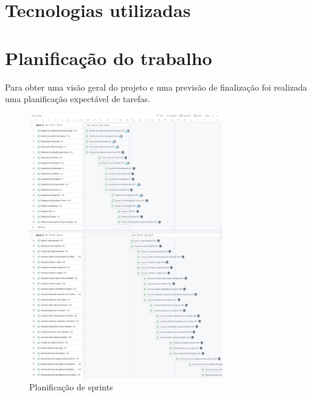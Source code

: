 \newpage

\section{Tecnologias utilizadas}




\newpage



\newpage



\newpage

\section{Planificação do trabalho}\label{sec:planificacao trabalho}

Para obter uma visão geral do projeto e uma previsão de finalização foi realizada uma planificação expectável de tarefas.

\begin{figure}[htb]
    \centering
    
    \includegraphics[width=0.75\textwidth]{images/etapa1_sprint_planning.png}
    \caption{Planificação de sprints}
    \label{fig:1}
\end{figure}




